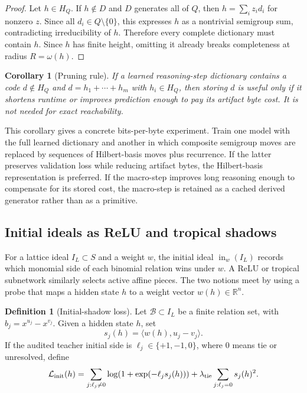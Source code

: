 \documentclass[11pt]{article}
\newtheorem{corollary}[theorem]{Corollary}
\theoremstyle{definition}
\newtheorem{definition}[theorem]{Definition}
\newcommand{\RR}{\mathbb{R}}
\begin{document}
\begin{proof}
Let \(h\in H_Q\).  If \(h\notin D\) and \(D\) generates all of \(Q\), then \(h=\sum_i z_i d_i\) for nonzero \(z\).  Since all \(d_i\in Q\setminus\{0\}\), this expresses \(h\) as a nontrivial semigroup sum, contradicting irreducibility of \(h\).  Therefore every complete dictionary must contain \(h\).  Since \(h\) has finite height, omitting it already breaks completeness at radius \(R=\omega(h)\).
\end{proof}

\begin{corollary}[Pruning rule]
If a learned reasoning-step dictionary contains a code \(d\notin H_Q\) and \(d=h_1+\cdots+h_m\) with \(h_i\in H_Q\), then storing \(d\) is useful only if it shortens runtime or improves prediction enough to pay its artifact byte cost.  It is not needed for exact reachability.
\end{corollary}

This corollary gives a concrete bits-per-byte experiment.  Train one model with the full learned dictionary and another in which composite semigroup moves are replaced by sequences of Hilbert-basis moves plus recurrence.  If the latter preserves validation loss while reducing artifact bytes, the Hilbert-basis representation is preferred.  If the macro-step improves long reasoning enough to compensate for its stored cost, the macro-step is retained as a cached derived generator rather than as a primitive.

\subsection{Initial ideals as ReLU and tropical shadows}
For a lattice ideal \(I_L\subset S\) and a weight \(w\), the initial ideal \(\operatorname{in}_w(I_L)\) records which monomial side of each binomial relation wins under \(w\).  A ReLU or tropical subnetwork similarly selects active affine pieces.  The two notions meet by using a probe that maps a hidden state \(h\) to a weight vector \(w(h)\in\RR^n\).

\begin{definition}[Initial-shadow loss]
Let \(\mathcal B\subset I_L\) be a finite relation set, with \(b_j=x^{u_j}-x^{v_j}\).  Given a hidden state \(h\), set
\[
  s_j(h)=\langle w(h),u_j-v_j\rangle.
\]
If the audited teacher initial side is \(\ell_j\in\{+1,-1,0\}\), where \(0\) means tie or unresolved, define
\[
  \mathcal L_{\rm init}(h)=\sum_{j:\ell_j\ne0} \log(1+\exp(-\ell_j s_j(h)))
  +\lambda_{\rm tie}\sum_{j:\ell_j=0} s_j(h)^2.
\]
\end{definition}
\end{document}
